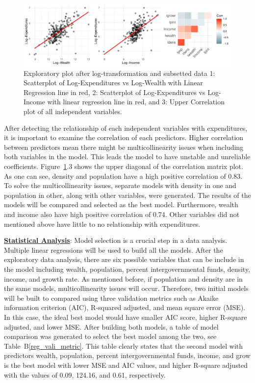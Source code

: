 \documentclass[11pt]{article}\usepackage[]{graphicx}\usepackage[]{color}
\makeatletter
\def\maxwidth{ %
  \ifdim\Gin@nat@width>\linewidth
    \linewidth
  \else
    \Gin@nat@width
  \fi
}
\makeatother
\begin{document}
\begin{figure}[h!] 
\begin{center}

\includegraphics[width=\maxwidth]{figure/unnamed-chunk-3-1} 

\caption{Exploratory plot after log-transformation and subsetted data 1: Scatterplot of Log-Expenditures vs Log-Wealth with Linear Regression line in red, 2: Scatterplot of Log-Expenditures vs Log-Income with linear regression line in red, and 3: Upper Correlation plot of all independent variables.}
\label{sec-explore}
\end{center} 
\end{figure}

\noindent After detecting the relationship of each independent variables with expenditures, it is important to examine the correlation of each predictors. Higher correlation between predictors mean there might be multicollinearity issues when including both variables in the model. This leads the model to have unstable and unreliable coefficients. Figure~\ref{sec-explore}.3 shows the upper diagonal of the correlation matrix plot. As one can see, density and population have a high positive correlation of 0.83. To solve the multicollinearity issues, separate models with density in one and population in other, along with other variables, were generated. The results of the models will be compared and selected as the best model. Furthermore, wealth and income also have high positive correlation of 0.74. Other variables did not mentioned above have little to no relationship with expenditures.          
\hfill \break



\noindent\textbf{\underline{Statistical Analysis}}: Model selection is a crucial step in a data analysis. Multiple linear regressions will be used to build all the models. After the exploratory data analysis, there are six possible variables that can be include in the model including wealth, population, percent intergovernmental funds, density, income, and growth rate. As mentioned before, if population and density are in the same models, multicollinearity issues will occur. Therefore, two initial models will be built to compared using three validation metrics such as Akaike information criterion (AIC), R-squared adjusted, and mean square error (MSE). In this case, the ideal best model would have smaller AIC score, higher R-square adjusted, and lower MSE. After building both models, a table of model comparison was generated to select the best model among the two, see Table~B\ref{reg_vali_metric}. This table clearly states that the second model with predictors wealth, population, percent intergovernmental funds, income, and grow is the best model with lower MSE and AIC values, and higher R-square adjusted with the values of 0.09, 124.16, and 0.61, respectively.
\hfill \break
\end{document}

